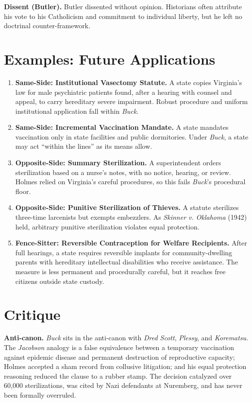 \documentclass[12pt]{article}
\begin{document}
\textbf{Dissent (Butler).} Butler dissented without opinion. Historians often attribute his vote to his Catholicism and commitment to individual liberty, but he left no doctrinal counter-framework.

\section{Examples: Future Applications}

\begin{enumerate}
\item \textbf{Same-Side: Institutional Vasectomy Statute.} A state copies Virginia's law for male psychiatric patients found, after a hearing with counsel and appeal, to carry hereditary severe impairment. Robust procedure and uniform institutional application fall within \textit{Buck}.
\item \textbf{Same-Side: Incremental Vaccination Mandate.} A state mandates vaccination only in state facilities and public dormitories. Under \textit{Buck}, a state may act ``within the lines'' as its means allow.
\item \textbf{Opposite-Side: Summary Sterilization.} A superintendent orders sterilization based on a nurse's notes, with no notice, hearing, or review. Holmes relied on Virginia's careful procedures, so this fails \textit{Buck}'s procedural floor.
\item \textbf{Opposite-Side: Punitive Sterilization of Thieves.} A statute sterilizes three-time larcenists but exempts embezzlers. As \textit{Skinner v. Oklahoma} (1942) held, arbitrary punitive sterilization violates equal protection.
\item \textbf{Fence-Sitter: Reversible Contraception for Welfare Recipients.} After full hearings, a state requires reversible implants for community-dwelling parents with hereditary intellectual disabilities who receive assistance. The measure is less permanent and procedurally careful, but it reaches free citizens outside state custody.
\end{enumerate}

\section{Critique}

\textbf{Anti-canon.} \textit{Buck} sits in the anti-canon with \textit{Dred Scott}, \textit{Plessy}, and \textit{Korematsu}. The \textit{Jacobson} analogy is a false equivalence between a temporary vaccination against epidemic disease and permanent destruction of reproductive capacity; Holmes accepted a sham record from collusive litigation; and his equal protection reasoning reduced the clause to a rubber stamp. The decision catalyzed over 60,000 sterilizations, was cited by Nazi defendants at Nuremberg, and has never been formally overruled.
\end{document}
